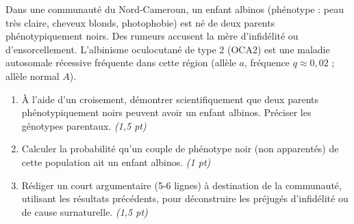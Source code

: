 \documentclass[11pt]{article}
\begin{document}
\begin{exercice}
\label{exo:prejuges}
Dans une communauté du Nord-Cameroun, un enfant albinos (phénotype : peau très claire, cheveux blonds, photophobie) est né de deux parents phénotypiquement noirs. Des rumeurs accusent la mère d'infidélité ou d'ensorcellement. L'albinisme oculocutané de type 2 (OCA2) est une maladie autosomale récessive fréquente dans cette région (allèle $a$, fréquence $q \approx 0,02$ ; allèle normal $A$).
\begin{enumerate}
    \item À l'aide d'un croisement, démontrer scientifiquement que deux parents phénotypiquement noirs peuvent avoir un enfant albinos. Préciser les génotypes parentaux. \textit{(1,5 pt)}
    \item Calculer la probabilité qu'un couple de phénotype noir (non apparentés) de cette population ait un enfant albinos. \textit{(1 pt)}
    \item Rédiger un court argumentaire (5-6 lignes) à destination de la communauté, utilisant les résultats précédents, pour déconstruire les préjugés d'infidélité ou de cause surnaturelle. \textit{(1,5 pt)}
\end{enumerate}
\end{exercice}
\end{document}
